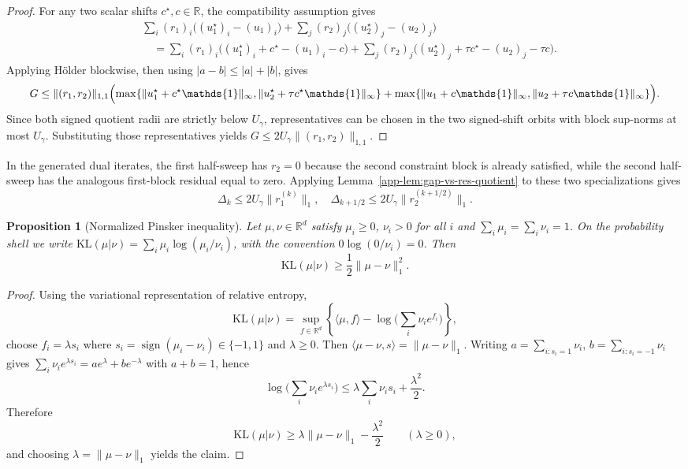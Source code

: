 \documentclass{article}
\theoremstyle{plain}
\newtheorem{proposition}{Proposition}[section]
\newcommand{\ones}{\mathds{1}}
\newcommand{\RR}{\mathbb{R}}
\newcommand{\Umax}{U_\gamma}
\newcommand{\KLdiv}[2]{\mathrm{KL}(#1|#2)}
\begin{document}
\begin{proof}
For any two scalar shifts $c^\star,c\in\RR$, the compatibility assumption gives
\[
\begin{aligned}
&\sum_i(r_1)_i\bigl((u_1^\star)_i-(u_1)_i\bigr)
  +\sum_j(r_2)_j\bigl((u_2^\star)_j-(u_2)_j\bigr)\\
&\quad =
  \sum_i(r_1)_i\bigl((u_1^\star)_i+c^\star-(u_1)_i-c\bigr)
  +\sum_j(r_2)_j\bigl((u_2^\star)_j+\tau c^\star-(u_2)_j-\tau c\bigr).
\end{aligned}
\]
Applying Hölder blockwise, then using $|a-b|\le |a|+|b|$, gives
\[
  G
  \le
  \|(r_1,r_2)\|_{1,1}
  \Bigl(
    \max\{\|u_1^\star+c^\star\ones\|_\infty,
           \|u_2^\star+\tau c^\star\ones\|_\infty\}
   +\max\{\|u_1+c\ones\|_\infty,
           \|u_2+\tau c\ones\|_\infty\}
  \Bigr).
\]
Since both signed quotient radii are strictly below $\Umax$, representatives can be chosen in
the two signed-shift orbits with block sup-norms at most $\Umax$.  Substituting those representatives yields
$G\le 2\Umax\|(r_1,r_2)\|_{1,1}$.
\end{proof}

In the generated dual iterates, the first half-sweep has $r_2=0$ because the second constraint
block is already satisfied, while the second half-sweep has the analogous first-block residual
equal to zero.  Applying Lemma~\ref{app-lem:gap-vs-res-quotient} to these two specializations gives
\begin{equation}\label{app-eq:gap-vs-res-quotient-final2}
  \Delta_k  \le  2 \Umax \|r_1^{(k)}\|_{1}, \quad
  \Delta_{k+1/2}  \le  2 \Umax \|r_2^{(k+1/2)}\|_{1}.
\end{equation}

\begin{proposition}[Normalized Pinsker inequality]\label{app-prop:pinsker-normalized}
Let $\mu,\nu\in\RR^d$ satisfy $\mu_i\ge 0$, $\nu_i>0$ for all $i$ and
$\sum_i\mu_i=\sum_i\nu_i=1$.  On the probability shell we write
$\KLdiv{\mu}{\nu}=\sum_i\mu_i\log(\mu_i/\nu_i)$, with the convention
$0\log(0/\nu_i)=0$.  Then
\[
  \KLdiv{\mu}{\nu}
  \ge
  \frac12\|\mu-\nu\|_1^2.
\]
\end{proposition}

\begin{proof}
Using the variational representation of relative entropy,
\[
  \KLdiv{\mu}{\nu}
  =
  \sup_{f\in\RR^d}
  \left\{
    \langle \mu,f\rangle
    - \log\!\Big(\sum_i \nu_i e^{f_i}\Big)
  \right\},
\]
choose $f_i=\lambda s_i$ where $s_i=\operatorname{sign}(\mu_i-\nu_i)\in\{-1,1\}$ and $\lambda\ge0$. Then $\langle \mu-\nu,s\rangle=\|\mu-\nu\|_1$. Writing $a=\sum_{i:s_i=1}\nu_i$, $b=\sum_{i:s_i=-1}\nu_i$ gives $\sum_i \nu_i e^{\lambda s_i}=a e^\lambda+b e^{-\lambda}$ with $a+b=1$, hence
\[
  \log\!\Big(\sum_i \nu_i e^{\lambda s_i}\Big)
  \le
  \lambda\sum_i \nu_i s_i+\frac{\lambda^2}{2}.
\]
Therefore
\[
  \KLdiv{\mu}{\nu}
  \ge
  \lambda\|\mu-\nu\|_1-\frac{\lambda^2}{2}
  \qquad(\lambda\ge0),
\]
and choosing $\lambda=\|\mu-\nu\|_1$ yields the claim.
\end{proof}
\end{document}
